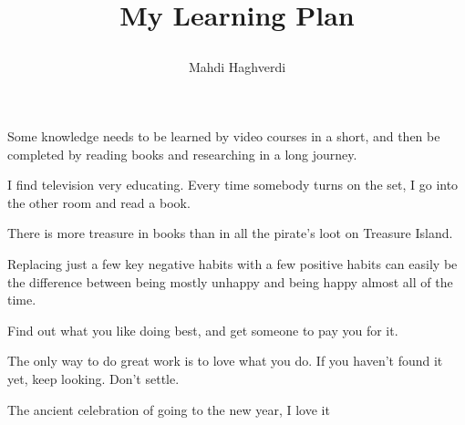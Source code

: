 \documentclass[12pt, dvipsnames, svgnames, x11names, oneside]{book}
\title{\roundpic[xshift=-3mm,yshift=-5mm]{5.8cm}{9cm}{./images/lamp}\vspace{3mm}
	
	My Learning Plan
}
\author{Mahdi Haghverdi}
\begin{document}
	\maketitle
	\frontmatter
	\tableofcontents
	\clearpage
	
	\mainmatter		
	
	\begin{savequote}[80mm]
		Some knowledge needs to be learned by video courses in a short, and then be completed by reading books and researching in a long journey.
	\end{savequote}
		
	
	\begin{savequote}[80mm]
		I find television very educating. Every time somebody turns on the set, I go into the other room and read a book.
		
		There is more treasure in books than in all the pirate’s loot on Treasure Island.
	\end{savequote}
		
	
	\begin{savequote}[80mm]
		Replacing just a few key negative habits with a few positive habits can easily be the difference between being mostly unhappy and being happy almost all of the time.
	\end{savequote}
	
	
	\begin{savequote}[80mm]
		Find out what you like doing best, and get someone to pay you for it.
		
		The only way to do great work is to love what you do. If you haven't found it yet, keep looking. Don't settle.
	\end{savequote}
	
	
	\begin{savequote}[80mm]
	The ancient celebration of going to the new year, I love it
	\end{savequote}
		
\end{document}
